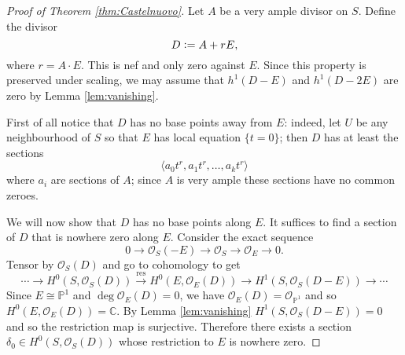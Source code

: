 \documentclass[a4paper,11pt]{amsart}
\def\deg{\operatorname{deg}}
\newcommand{\OO}{\mathcal{O}}
\newcommand{\CC}{\mathbb{C}}
\newcommand{\PP}{\mathbb{P}}
\newcommand{\isom}{\cong}
\newcommand{\defeq}{\vcentcolon=}
\begin{document}
\begin{proof}[Proof of Theorem \ref{thm:Castelnuovo}]
	Let $A$ be a very ample divisor on $S$.
	Define the divisor
	\[
	D \defeq A + r E,
	\]
	where $r = A\cdot E$.
	This is nef and only zero against $E$.
	Since this property is preserved under scaling, we may assume that $h^1(D-E)$ and $h^1(D-2E)$ are zero by Lemma \ref{lem:vanishing}.
	
	First of all notice that $D$ has no base points away from $E$:
	indeed, let $U$ be any neighbourhood of $S$ so that $E$ has local equation $\{t=0\}$;
	then $D$ has at least the sections
	\[
	\langle
		a_0t^r, a_1t^r, \dots, a_kt^r
	\rangle
	\]
	where $a_i$ are sections of $A$;
	since $A$ is very ample these sections have no common zeroes.	
	
	We will now show that $D$ has no base points along $E$.
	It suffices to find a section of $D$ that is nowhere zero along $E$.
	Consider the exact sequence
	\[
	0 \to \OO_S(-E) \to \OO_S \to \OO_E \to 0.
	\]
	Tensor by $\OO_S(D)$ and go to cohomology to get
	\[
	\cdots \to H^0(S,\OO_S(D)) \overset{\text{res}}{\longrightarrow} H^0(E,\OO_E(D)) \to H^1(S,\OO_S(D-E)) \to \cdots
	\]
	Since $E \isom \PP^1$ and $\deg \OO_E(D) = 0$, we have $\OO_E(D) = \OO_{\PP^1}$ and so $H^0(E,\OO_E(D)) = \CC$.
	By Lemma \ref{lem:vanishing} $H^1(S,\OO_S(D-E)) = 0$ and so the restriction map is surjective.
	Therefore there exists a section $\delta_0 \in H^0(S,\OO_S(D))$ whose restriction to $E$ is nowhere zero.
\end{proof}
\end{document}
